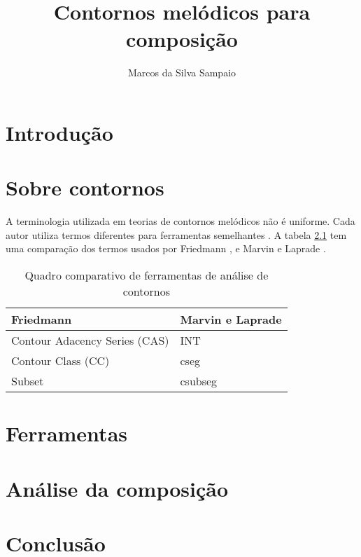 \documentclass[12pt,brazil]{book}
\title{Contornos melódicos para composição}
\author{Marcos da Silva Sampaio}
\begin{document}
\maketitle

\chapter{Introdução}
\label{cha:introducao}

\chapter{Sobre contornos}
\label{cha:sobre-contornos}

A terminologia utilizada em teorias de contornos melódicos não é
uniforme. Cada autor utiliza termos diferentes para ferramentas
semelhantes \cite{friedmann87:response}. A tabela
\ref{tab:compara-ferramentas} tem uma comparação dos termos usados por
Friedmann \cite{friedmann85:methodology}, e Marvin e Laprade
\cite{marvin.ea87:relating}.

\begin{table}
  \centering
  \begin{tabular}{l|l}
    Friedmann & Marvin e Laprade \\ \hline
    Contour Adacency Series (CAS) & INT \\
    Contour Class (CC) & cseg \\
    Subset & csubseg 
  \end{tabular}
  \caption{Quadro comparativo de ferramentas de análise de contornos}
  \label{tab:compara-ferramentas}
\end{table}
 
\chapter{Ferramentas}
\label{cha:ferramentas}

\chapter{Análise da composição}
\label{cha:anal-da-comp}

\chapter{Conclusão}
\label{cha:conclusao}




\end{document}
